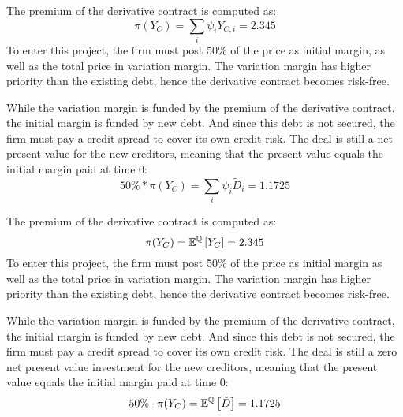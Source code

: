 \documentclass[../main.tex]{subfiles}
\begin{document}
        The premium of the derivative contract is computed as:
        \begin{equation}
            \pi(Y_C) = \sum_i \psi_i Y_{C,i} = 2.345
        \end{equation}
        To enter this project, the firm must post 50\% of the price as initial margin, as well as the total price in variation margin.
        The variation margin has higher priority than the existing debt, hence the derivative contract becomes risk-free.

        While the variation margin is funded by the premium of the derivative contract, the initial margin is funded by new debt. And since this debt is not secured, the firm must pay a credit spread to cover its own credit risk. The deal is still a net present value for the new creditors, meaning that the present value equals the initial margin paid at time 0:
        \begin{equation}
            50\% * \pi(Y_C) = \sum_i \psi_i \tilde{D}_{i} = 1.1725
        \end{equation}

        The premium of the derivative contract is computed as:
        \begin{equation}
            \pi(Y_C) = \mathbb{E}^{\mathbb{Q}}\left[Y_{C}\right] = 2.345
        \end{equation}
        To enter this project, the firm must post 50\% of the price as initial margin as well as the total price in variation margin.
        The variation margin has higher priority than the existing debt, hence the derivative contract becomes risk-free.

        While the variation margin is funded by the premium of the derivative contract, the initial margin is funded by new debt. And since this debt is not secured, the firm must pay a credit spread to cover its own credit risk. The deal is still a zero net present value investment for the new creditors, meaning that the present value equals the initial margin paid at time 0:
        \begin{equation}
            50\% \cdot \pi(Y_C) = \mathbb{E}^{\mathbb{Q}}\left[\tilde{D}\right] = 1.1725
        \end{equation}
\end{document}
